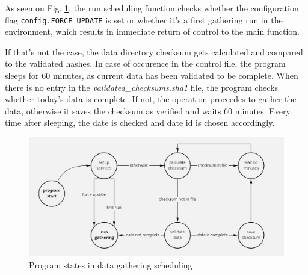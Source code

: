 As seen on Fig. \ref{fig:gathering_schedule}, the run scheduling function checks whether the configuration flag \linebreak \texttt{config.FORCE\_UPDATE} is set or whether it's a first gathering run in the environment, which results in immediate return of control to the main function. \par
If that's not the case, the data directory checksum gets calculated and compared to the validated hashes. In case of occurence in the control file, the program sleeps for 60 minutes, as current data has been validated to be complete. When there is no entry in the \textit{validated\_checksums.sha1} file, the program checks whether today's data is complete. If not, the operation proceedes to gather the data, otherwise it saves the checksum as verified and waits 60 minutes. Every time after sleeping, the date is checked and date id is chosen accordingly.

\begin{figure}[ht]
      \centering
      \includegraphics[width=\textwidth]{figures/gathering_schedule.png}
      \caption{Program states in data gathering scheduling}
      \label{fig:gathering_schedule}
\end{figure}

